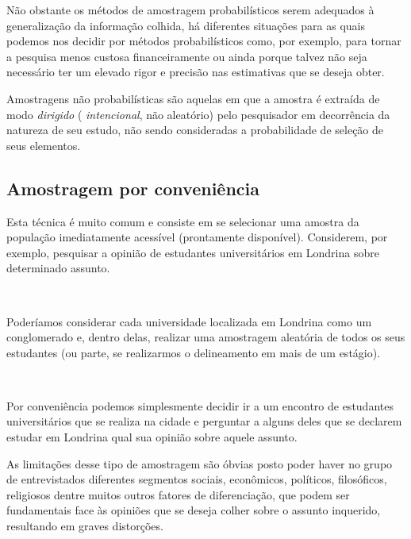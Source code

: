 \documentclass[
]{book}
\begin{document}
\hfill\break

Não obstante os métodos de amostragem probabilísticos serem adequados à generalização da informação colhida, há diferentes situações para as quais podemos nos decidir por métodos probabilísticos como, por exemplo, para tornar a pesquisa menos custosa financeiramente ou ainda porque talvez não seja necessário ter um elevado rigor e precisão nas estimativas que se deseja obter.

\hfill\break

Amostragens não probabilísticas são aquelas em que a amostra é extraída de modo \emph{dirigido} ( \emph{intencional}, não aleatório) pelo pesquisador em decorrência da natureza de seu estudo, não sendo consideradas a probabilidade de seleção de seus elementos.

\hypertarget{amostragem-por-conveniuxeancia}{%
\subsection{Amostragem por conveniência}\label{amostragem-por-conveniuxeancia}}

\hfill\break

Esta técnica é muito comum e consiste em se selecionar uma amostra da população imediatamente acessível (prontamente disponível). Considerem, por exemplo, pesquisar a opinião de estudantes universitários em Londrina sobre determinado assunto.

~

Poderíamos considerar cada universidade localizada em Londrina como um conglomerado e, dentro delas, realizar uma amostragem aleatória de todos os seus estudantes (ou parte, se realizarmos o delineamento em mais de um estágio).

~

Por conveniência podemos simplesmente decidir ir a um encontro de estudantes universitários que se realiza na cidade e perguntar a alguns deles que se declarem estudar em Londrina qual sua opinião sobre aquele assunto.

\hfill\break

As limitações desse tipo de amostragem são óbvias posto poder haver no grupo de entrevistados diferentes segmentos sociais, econômicos, políticos, filosóficos, religiosos dentre muitos outros fatores de diferenciação, que podem ser fundamentais face às opiniões que se deseja colher sobre o assunto inquerido, resultando em graves distorções.

\hfill\break
\end{document}
